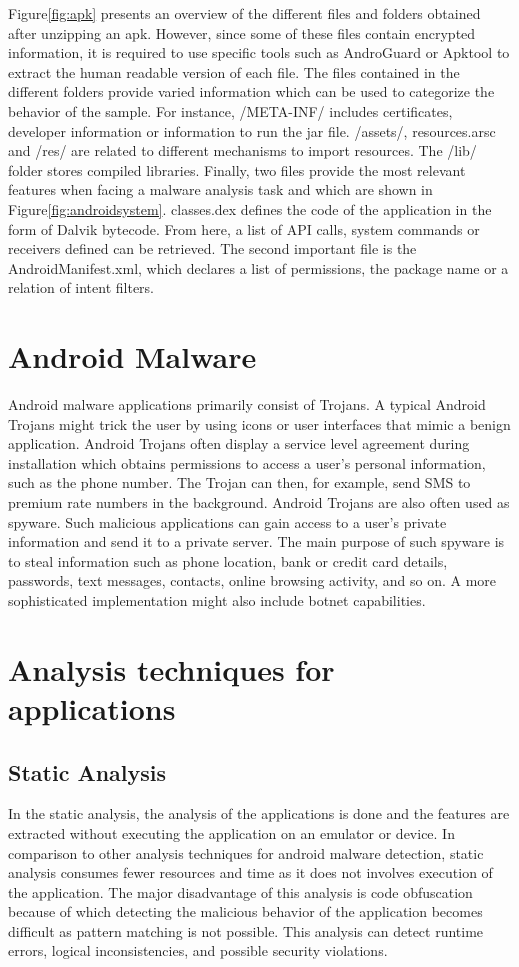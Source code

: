 Figure\ref{fig:apk} presents an overview of the different files and folders obtained after unzipping an \ac{apk}. However, since some of these files contain encrypted information, it is required to use specific tools such as AndroGuard \cite{androguard} or Apktool\cite{apktool} to extract the human readable
version of each file. The files contained in the different folders provide varied information which
can be used to categorize the behavior of the sample. For instance, /META-INF/ includes certificates, developer information or information to run the jar file. /assets/, resources.arsc and
/res/ are related to different mechanisms to import resources. The /lib/ folder stores compiled
libraries. Finally, two files provide the most relevant features when facing a malware analysis
task and which are shown in Figure\ref{fig:androidsystem}. classes.dex defines the code of the application in the
form of Dalvik bytecode. From here, a list of API calls, system commands or receivers defined
can be retrieved. The second important file is the AndroidManifest.xml, which declares a list of
permissions, the package name or a relation of intent filters.

\section{Android Malware}

Android malware applications primarily consist of
Trojans. A typical Android Trojans might trick the
user by using icons or user interfaces that mimic a
benign application. Android Trojans often display a
service level agreement during installation which
obtains permissions to access a user’s personal
information, such as the phone number. The Trojan
can then, for example, send SMS to premium rate
numbers in the background.
Android Trojans are also often used as spyware.
Such malicious applications can gain access to a
user’s private information and send it to a private
server. The main purpose of such spyware is to steal
information such as phone location, bank or credit
card details, passwords, text messages, contacts,
online browsing activity, and so on. A more
sophisticated implementation might also include
botnet capabilities.


\section{Analysis techniques for applications}
\subsection{Static Analysis}
In the static analysis, the analysis of the applications is done and the features are extracted without executing the application on an emulator or device. In comparison to other analysis techniques for android malware detection, static analysis consumes fewer resources and time as it does not involves execution of the application. The major disadvantage of this analysis is code obfuscation because of which detecting the malicious behavior of the application becomes difficult as pattern matching is not possible. This analysis can detect runtime errors, logical inconsistencies, and possible security violations.

